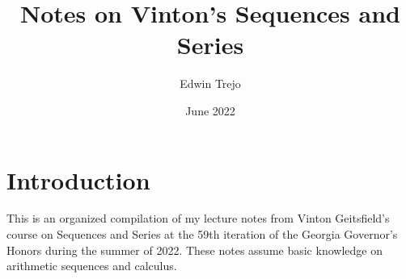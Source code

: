 \documentclass{article}
\title{Notes on Vinton's Sequences and Series}
\author{Edwin Trejo}
\date{June 2022}
\begin{document}
\maketitle

\section{Introduction}

This is an organized compilation of my lecture notes from Vinton Geitsfield's course on Sequences and Series at the 59th iteration of the Georgia Governor's Honors during the summer of 2022. 
These notes assume basic knowledge on arithmetic sequences and calculus. 










\end{document}
